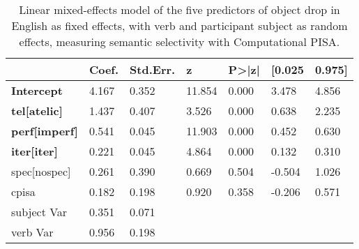 \begin{table}[htb] %
\caption{Linear mixed-effects model of the five predictors of object drop in English as fixed effects, with verb and participant subject as random effects, measuring semantic selectivity with Computational PISA.}
\begin{tabular}{l|llllll}
                         & Coef. & Std.Err. & z      & P\textgreater{}|z| & {[}0.025 & 0.975{]} \\
\hline                         
\textbf{Intercept}             & 4.167 & 0.352    & 11.854 & 0.000              & 3.478    & 4.856    \\
\textbf{tel{[}atelic{]} }    & 1.437 & 0.407    & 3.526  & 0.000              & 0.638    & 2.235    \\
\textbf{perf{[}imperf{]}} & 0.541 & 0.045    & 11.903 & 0.000              & 0.452    & 0.630    \\
\textbf{iter{[}iter{]}}    & 0.221 & 0.045    & 4.864  & 0.000              & 0.132    & 0.310    \\
spec{[}nospec{]}     & 0.261 & 0.390    & 0.669  & 0.504              & -0.504   & 1.026    \\
cpisa                    & 0.182 & 0.198    & 0.920  & 0.358              & -0.206   & 0.571    \\
subject                 Var   & 0.351    & 0.071  &                    &          &    &        \\
verb                     Var   & 0.956    & 0.198  &                    &          &   &      
\end{tabular}  
\end{table}


